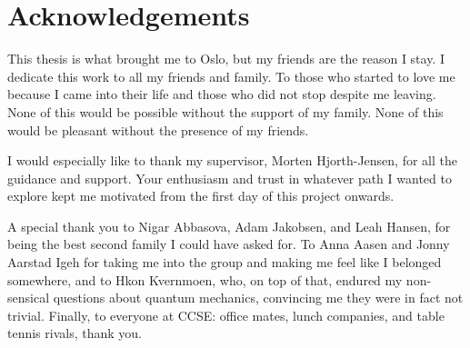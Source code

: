 \newpage
\section*{Acknowledgements}

This thesis is what brought me to Oslo, but my friends are the reason I stay. I dedicate this work to all my friends and family. To those who started to love me because I came into their life and those who did not stop despite me leaving. None of this would be possible without the support of my family. None of this would be pleasant without the presence of my friends.

I would especially like to thank my supervisor, Morten Hjorth-Jensen, for all the guidance and support. Your enthusiasm and trust in whatever path I wanted to explore kept me motivated from the first day of this project onwards.

A special thank you to Nigar Abbasova, Adam Jakobsen, and Leah Hansen, for being the best second family I could have asked for. To Anna Aasen and Jonny Aarstad Igeh for taking me into the group and making me feel like I belonged somewhere, and to Hkon Kvernmoen, who, on top of that, endured my non-sensical questions about quantum mechanics, convincing me they were in fact not trivial. Finally, to everyone at CCSE: office mates, lunch companies, and table tennis rivals, thank you.